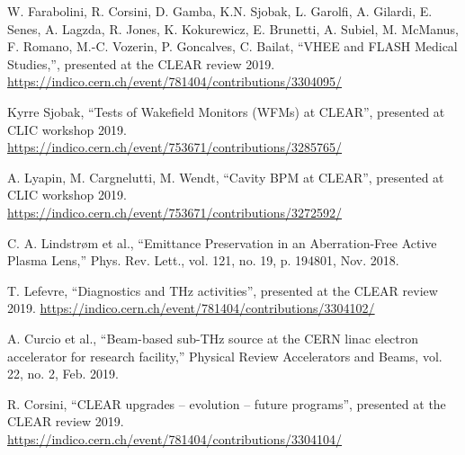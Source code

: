 \documentclass[a4paper,
               keeplastbox,   %
               ]{jacow}
\begin{document}
\begin{thebibliography}{99}
 W. Farabolini, R. Corsini, D. Gamba, K.N. Sjobak, L. Garolfi, A. Gilardi, E. Senes, A. Lagzda, R. Jones, K. Kokurewicz, E. Brunetti, A. Subiel, M. McManus, F. Romano, M.-C. Vozerin, P. Goncalves, C. Bailat, ``VHEE and FLASH Medical Studies,'', presented at the CLEAR review 2019. \url{https://indico.cern.ch/event/781404/contributions/3304095/}

 Kyrre Sjobak, ``Tests of Wakefield Monitors (WFMs) at CLEAR'', presented at CLIC workshop 2019. \url{https://indico.cern.ch/event/753671/contributions/3285765/}

 A. Lyapin, M. Cargnelutti, M. Wendt, ``Cavity BPM at CLEAR'', presented at CLIC workshop 2019. \url{https://indico.cern.ch/event/753671/contributions/3272592/}

 C. A. Lindstrøm et al., “Emittance Preservation in an Aberration-Free Active Plasma Lens,” Phys. Rev. Lett., vol. 121, no. 19, p. 194801, Nov. 2018.

 T. Lefevre, ``Diagnostics and THz activities'', presented at the CLEAR review 2019. \url{https://indico.cern.ch/event/781404/contributions/3304102/}

 A. Curcio et al., “Beam-based sub-THz source at the CERN linac electron accelerator for research facility,” Physical Review Accelerators and Beams, vol. 22, no. 2, Feb. 2019.

 R. Corsini, ``CLEAR upgrades -- evolution -- future programs'', presented at the CLEAR review 2019. \url{https://indico.cern.ch/event/781404/contributions/3304104/}

\end{thebibliography}
\end{document}
